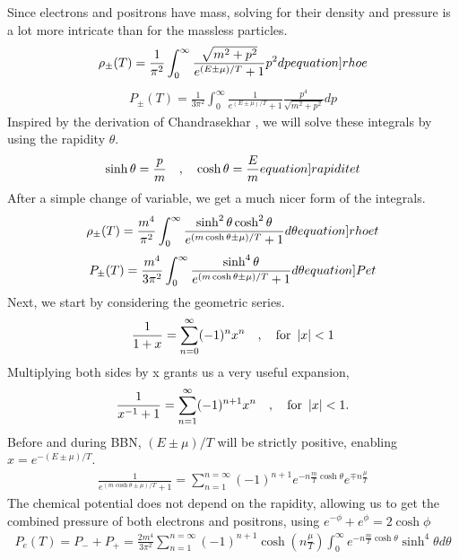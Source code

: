 Since electrons and positrons have mass, solving for their density and pressure is a lot more intricate than for the massless particles.
\begin{align}
    \rho_\pm(T)=\frac{1}{\pi^2}\int_{0}^{\infty}\frac{\sqrt{m^2+p^2}}{e^{(E\pm\mu)/T}+1}p^2 dp
    \label[equation]{rhoe}
\end{align}
\begin{align}
    P_\pm(T)=\frac{1}{3\pi^2}\int_{0}^{\infty}\frac{1}{e^{(E\pm\mu)/T}+1}\frac{p^4}{\sqrt{m^2+p^2}} dp
\end{align}
Inspired by the derivation of Chandrasekhar \cite{Chandrasekhar}, we will solve these integrals by using the rapidity $\theta$.
\begin{align}
    \sinh \theta = \frac{p}{m}\eqsep \cosh \theta = \frac{E}{m}
    \label[equation]{rapiditet}
\end{align}
After a simple change of variable, we get a much nicer form of the integrals.
\begin{align}
    \rho_\pm(T)=\frac{m^4}{\pi^2}\int_{0}^{\infty}\frac{\sinh^2 \theta \cosh^2\theta}{e^{(m \cosh\theta\pm\mu)/T}+1} d\theta
    \label[equation]{rhoet}
\end{align}
\begin{align}
    P_\pm(T)=\frac{m^4}{3\pi^2}\int_{0}^{\infty}\frac{\sinh^4 \theta}{e^{(m \cosh\theta\pm\mu)/T}+1} d\theta
    \label[equation]{Pet}
\end{align}
Next, we start by considering the geometric series.
\begin{align}
    \frac{1}{1+x}=\sum_{n=0}^{\infty}(-1)^n x^n \quad , \quad \text{for  }  \left|x\right|<1
\end{align}
Multiplying both sides by x grants us a very useful expansion,
\begin{align}
    \frac{1}{x^{-1}+1}=\sum_{n=1}^{\infty}(-1)^{n+1} x^n \quad , \quad \text{for  }  \left|x\right|<1.
\end{align}
Before and during BBN, $(E\pm\mu)/T $ will be strictly positive, enabling $x=e^{-(E\pm\mu)/T}$.
\begin{align}
    \frac{1}{e^{(m \cosh\theta\pm\mu)/T}+1}=\sum_{n=1}^{n=\infty} (-1)^{n+1} e^{-n\frac{m }{T}\cosh\theta}e^{\mp n\frac{\mu}{T}}
    \label{eq:electronseries}
\end{align}
The chemical potential does not depend on the rapidity, allowing us to get the combined pressure of both electrons and positrons, using $e^{-\phi}+e^{\phi}=2\cosh\phi$
\begin{align}
    P_e(T)=P_-+P_+=\frac{2m^4}{3\pi^2}\sum_{n=1}^{n=\infty} (-1)^{n+1} \cosh{\left(n\frac{\mu}{T}\right)}  \int_{0}^{\infty}e^{-n\frac{m }{T}\cosh\theta}\sinh^4 \theta d\theta
\end{align}

